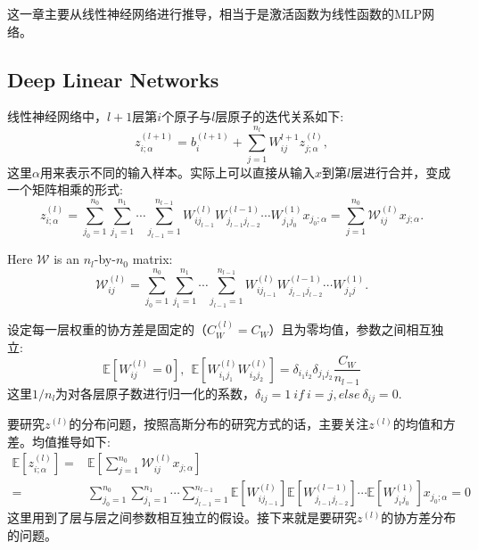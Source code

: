 这一章主要从线性神经网络进行推导，相当于是激活函数为线性函数的MLP网络。

\subsection{Deep Linear Networks}
\label{sec:3-1}

线性神经网络中，$l+1$层第$i$个原子与$l$层原子的迭代关系如下:
\begin{equation}
    z_{i;\alpha}^{(l+1)} = b_i^{(l+1)} + \sum_{j=1}^{n_l} W_{ij}^{l+1}z_{j;\alpha}^{(l)},
\end{equation}
这里$\alpha$用来表示不同的输入样本。实际上可以直接从输入$x$到第$l$层进行合并，变成一个矩阵相乘的形式:
\begin{equation}
    z_{i;\alpha}^{(l)} = \sum_{j_0=1}^{n_0}\sum_{j_1=1}^{n_1} \cdots \sum_{j_{l-1}=1}^{n_{l-1}}
                W_{ij_{l-1}}^{(l)} W_{j_{l-1}j_{l-2}}^{(l-1)} \cdots W_{j_1j_0}^{(1)} x_{j_0;\alpha}
              = \sum_{j=1}^{n_0} \mathcal{W}_{ij}^{(l)} x_{j;\alpha}.
\end{equation}

Here $\mathcal{W}$ is an $n_l$-by-$n_0$ matrix:
\begin{equation}
    \mathcal{W}_{ij}^{(l)} = \sum_{j_0=1}^{n_0}\sum_{j_1=1}^{n_1} \cdots \sum_{j_{l-1}=1}^{n_{l-1}}
                W_{ij_{l-1}}^{(l)} W_{j_{l-1}j_{l-2}}^{(l-1)} \cdots W_{j_1j}^{(1)}.
\end{equation}

设定每一层权重的协方差是固定的（$C_W^{(l)} = C_W$）且为零均值，参数之间相互独立:
\begin{equation}
    \mathbb{E}[W_{ij}^{(l)} = 0], ~~ \mathbb{E}[W_{i_1j_1}^{(l)}W_{i_2j_2}^{(l)}] 
                                    = \delta_{i_1i_2}\delta_{j_1j_2}\frac{C_W}{n_{l-1}}
    \label{eq:expectation}
\end{equation}
这里$1/n_l$为对各层原子数进行归一化的系数，$\delta_{ij} = 1 ~ if ~ i=j, else ~ \delta_{ij} = 0$.

要研究$z^{(l)}$的分布问题，按照高斯分布的研究方式的话，主要关注$z^{(l)}$的均值和方差。均值推导如下:
\begin{equation}
    \begin{aligned}
    \mathbb{E}[z_{i;\alpha}^{(l)}] =& \mathbb{E}[\sum_{j=1}^{n_0} \mathcal{W}_{ij}^{(l)} x_{j;\alpha}] \\
     =& \sum_{j_0=1}^{n_0}\sum_{j_1=1}^{n_1} \cdots \sum_{j_{l-1}=1}^{n_{l-1}}
       \mathbb{E}[W_{ij_{l-1}}^{(l)}] \mathbb{E}[W_{j_{l-1}j_{l-2}}^{(l-1)}]
       \cdots \mathbb{E}[W_{j_1j_0}^{(1)}] x_{j_0;\alpha} = 0
    \end{aligned}
\end{equation}
这里用到了层与层之间参数相互独立的假设。接下来就是要研究$z^{(l)}$的协方差分布的问题。

